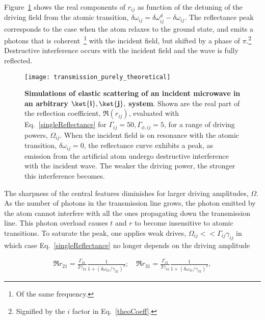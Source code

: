 Figure~\ref{singleDriveReflection}   shows  the   real  components   of
$ r_{ij} $  as function of the  detuning of the driving  field from the
atomic                                                      transition,
$  \delta\omega_{ij}  = \delta\omega_{ij}^{d}-\delta\omega_{ij}$.   The
reflectance peak corresponds  to the case when the atom  relaxes to the
ground state,  and emits  a photons  that is  coherent~\footnote{Of the
  same frequency.}  with the incident field,  but shifted by a phase of
$    \pi   $.\footnote{Signified    by   the    $   i    $   factor    in
  Eq.~\eqref{theoCoeff}.}   Destructive  interference occurs  with  the
incident field and the wave is fully reflected.

\begin{figure}[h]
  \centering
  \texttt{[image: transmission\_purely\_theoretical]}
  \caption{\small  \textbf{Simulations  of  elastic  scattering  of  an
      incident microwave in an arbitrary $ \mathbf{\ket{i}, \ket{j}}, $
      system}.  Shown are the real  part of the reflection coefficient,
    $  \Re(r_{ij}) $,  evaluated  with Eq.~\eqref{singleReflectance}  for
    $  \Gamma_{ij}=50, \Gamma_{\phi,ij}=5  $,  for a  range of  driving
    powers, $ \Omega_{ij}  $.  When the incident field  is on resonance
    with   the  atomic   transition,  $   \delta\omega_{ij}=0  $,   the
    reflectance curve exhibits a peak,  as emission from the artificial
    atom undergo destructive interference  with the incident wave.  The
    weaker the driving power, the stronger this interference becomes.}
  \label{singleDriveReflection}
\end{figure}

The sharpness  of the  central features  diminishes for  larger driving
amplitudes, $  \Omega $. As the  number of photons in  the transmission line
grows, the  photon emitted by  the atom  cannot interfere with  all the
ones  propagating down  the  transmission line.   This photon  overload
causes $ t $ and $ r $ to become insensitive to atomic transitions.  To
saturate      the     peak,      one      applies     weak      drives,
$     \Omega_{ij}<<\Gamma_{ij}\gamma_{ij}    $     in    which     case
Eq.~\eqref{singleReflectance}   no  longer   depends  on   the  driving
amplitude

\begin{equation}
  \begin{aligned}
    \Re{r_{21}}                                                         =
    \frac{\Gamma_{21}}{2\gamma_{21}}\frac{1}{1+(\delta\omega_{21}/\gamma_{21})^2};
    \quad
    \Re{r_{31}}=\frac{\Gamma_{31}}{2\gamma_{31}}\frac{1}{1+(\delta\omega_{31}/\gamma_{31})^2},
  \end{aligned}
  \label{singleLorentzian}
\end{equation}

